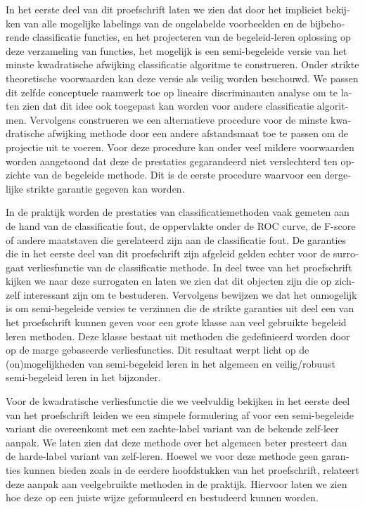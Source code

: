 \begin{otherlanguage}{dutch}
In het eerste deel van dit proefschrift laten we zien dat door het impliciet bekijken van alle mogelijke labelings van de ongelabelde voorbeelden en de bijbehorende classificatie functies, en het projecteren van de begeleid-leren oplossing op deze verzameling van functies, het mogelijk is een semi-begeleide versie van het minste kwadratische afwijking classificatie algoritme te construeren. Onder strikte theoretische voorwaarden kan deze versie als veilig worden beschouwd. We passen dit zelfde conceptuele raamwerk toe op lineaire discriminanten analyse om te laten zien dat dit idee ook toegepast kan worden voor andere classificatie algoritmen. Vervolgens construeren we een alternatieve procedure voor de minste kwadratische afwijking methode door een andere afstandsmaat toe te passen om de projectie uit te voeren. Voor deze procedure kan onder veel mildere voorwaarden worden aangetoond dat deze de prestaties gegarandeerd niet verslechterd ten opzichte van de begeleide methode. Dit is de eerste procedure waarvoor een dergelijke strikte garantie gegeven kan worden.

In de praktijk worden de prestaties van classificatiemethoden vaak gemeten aan de hand van de classificatie fout, de oppervlakte onder de ROC curve, de F-score of andere maatstaven die gerelateerd zijn aan de classificatie fout. De garanties die in het eerste deel van dit proefschrift zijn afgeleid gelden echter voor de surrogaat verliesfunctie van de classificatie methode. In deel twee van het proefschrift kijken we naar deze surrogaten en laten we zien dat dit objecten zijn die op zichzelf interessant zijn om te bestuderen. Vervolgens bewijzen we dat het onmogelijk is om semi-begeleide versies te verzinnen die de strikte garanties uit deel een van het proefschrift kunnen geven voor een grote klasse aan veel gebruikte begeleid leren methoden. Deze klasse bestaat uit methoden die gedefinieerd worden door op de marge gebaseerde verliesfuncties. Dit resultaat werpt licht op de (on)mogelijkheden van semi-begeleid leren in het algemeen en veilig/robuust semi-begeleid leren in het bijzonder.

Voor de kwadratische verliesfunctie die we veelvuldig bekijken in het eerste deel van het proefschrift leiden we een simpele formulering af voor een semi-begeleide variant die overeenkomt met een zachte-label variant van de bekende zelf-leer aanpak. We laten zien dat deze methode over het algemeen beter presteert dan de harde-label variant van zelf-leren. Hoewel we voor deze methode geen garanties kunnen bieden zoals in de eerdere hoofdstukken van het proefschrift, relateert deze aanpak aan veelgebruikte methoden in de praktijk. Hiervoor laten we zien hoe deze op een juiste wijze geformuleerd en bestudeerd kunnen worden.


\end{otherlanguage}

